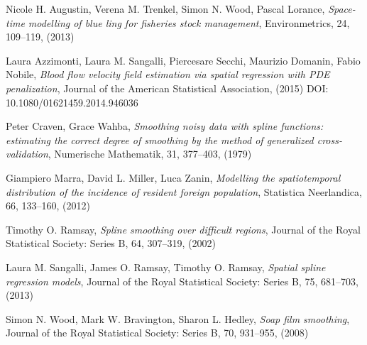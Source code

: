 \documentclass[a4paper,11pt,twoside,openright]{book}							%
\begin{document}
\begin{thebibliography}{9}

Nicole H. Augustin, Verena M. Trenkel, Simon N. Wood, Pascal Lorance, \emph{Space-time modelling of blue ling for fisheries stock management}, Environmetrics, 24, 109–119, (2013)

Laura Azzimonti, Laura M. Sangalli, Piercesare Secchi, Maurizio Domanin, Fabio Nobile, \emph{Blood flow velocity field estimation via spatial regression with PDE penalization}, Journal of the American Statistical Association, (2015) DOI: 10.1080/01621459.2014.946036

Peter Craven, Grace Wahba, \emph{Smoothing noisy data with spline functions: estimating the correct degree of smoothing by the method of generalized cross-validation}, Numerische Mathematik, 31, 377–403, (1979)

Giampiero Marra, David L. Miller, Luca Zanin, \emph{Modelling the spatiotemporal distribution of the incidence of resident foreign population}, Statistica Neerlandica, 66, 133–160, (2012)

Timothy O. Ramsay, \emph{Spline smoothing over difficult regions}, Journal of the Royal Statistical Society: Series B, 64, 307–319, (2002)

Laura M. Sangalli, James O. Ramsay, Timothy O. Ramsay, \emph{Spatial spline regression models}, Journal of the Royal Statistical Society: Series B, 75, 681–703, (2013)

Simon N. Wood, Mark W. Bravington, Sharon L. Hedley, \emph{Soap film smoothing}, Journal of the Royal Statistical Society: Series B, 70, 931–955, (2008)



\end{thebibliography}
\end{document}
